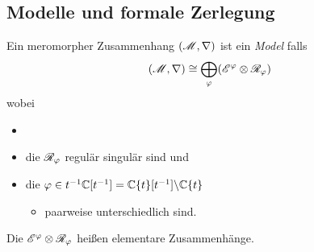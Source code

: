 \TODO[\cite{sabbah2007isomonodromic}: Def II.2.24]
\subsection{Modelle und formale Zerlegung}%
\begin{comment}
  Durch das Tensorieren mit formalen Potenzreihen erhält man einen Funktor.
\end{comment}
\begin{defn}
  Ein meromorpher Zusammenhang $(\mathscr{M},\nabla)$ ist ein \emph{Model} falls
  \[
    (\mathscr{M},\nabla)
    \cong
    \bigoplus_\varphi(\mathscr{E}^\varphi\otimes\mathscr{R}_\varphi)
  \]
  wobei
  \begin{itemize}
    \item {}
    \item die $\mathscr{R}_\varphi$ regulär singulär sind und
    \item die
      $\varphi\in t^{-1}\mathbb{C}[t^{-1}]=\mathbb{C}\{t\}[t^{-1}]\backslash\mathbb{C}\{t\}$
      \begin{itemize}
        \item paarweise unterschiedlich sind.
      \end{itemize}
  \end{itemize}
  Die $\mathscr{E}^\varphi\otimes\mathscr{R}_\varphi$ heißen elementare Zusammenhänge.
\end{defn}
\begin{comment}
  \begin{thm}[Levelt-Turittin]
    Zu einem formalem meromorphen Zusammenhang gibt es, bis auf Zurückziehen,
    immer einen Isomorphismus zu einer direkten Summe formaler elementarer
    Zusammenhänge.
    \begin{rem}
      \textbf{Übergang:}
      Aber keinen konvergenten lift.
      Sektorweise aber schon mit asymptotischer Analysis
    \end{rem}
  \end{thm}
\end{comment}
